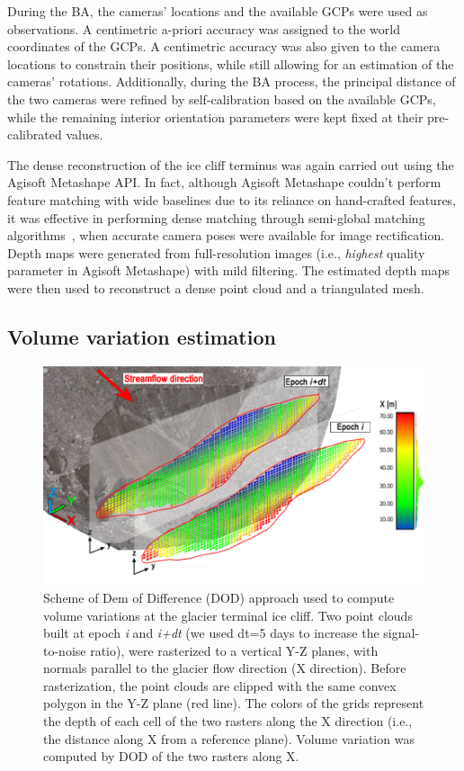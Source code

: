 During the BA, the cameras' locations and the available GCPs were used as observations.
A centimetric a-priori accuracy was assigned to the world coordinates of the GCPs.
A centimetric accuracy was also given to the camera locations to constrain their
positions, while still allowing for an estimation of the cameras' rotations.
Additionally, during the BA process, the principal distance of the
two cameras were refined by self-calibration based on the available GCPs, while the
remaining interior orientation parameters were kept fixed at their pre-calibrated values.

The dense reconstruction of the ice cliff terminus was again carried out using the
Agisoft Metashape API.
In fact, although Agisoft Metashape couldn't perform feature matching with wide baselines
due to its reliance on hand-crafted features, it was effective in performing dense
matching through semi-global matching
algorithms~\citep{Hirschmuller2012}, when accurate camera poses were available for image
rectification.
Depth maps were generated from full-resolution images (i.e., \textit{highest} quality parameter in Agisoft Metashape) with mild filtering.
The estimated depth maps were then used to reconstruct a dense point cloud and a
triangulated mesh.


\subsection{Volume variation estimation}\label{sec:4:volumevariation}

\begin{figure}[ht]
\centering
  \includegraphics[width=1.0\linewidth]{3_dod_scheme.png}
  \caption{Scheme of Dem of Difference (DOD) approach used to compute volume variations
    at the glacier terminal ice cliff.
    Two point clouds built at epoch \textit{i} and \textit{i+dt} (we used dt=5 days to increase the signal-to-noise ratio), were rasterized to a vertical Y-Z planes, with normals parallel to the glacier flow direction (X direction).
    Before rasterization, the point clouds are clipped with the same convex polygon in
    the Y-Z plane (red line).
    The colors of the grids represent the depth of each cell of the two rasters along the X direction (i.e., the distance along X from a reference plane).
    Volume variation was computed by DOD of the two rasters along X.}
  \label{fig:4:dod_scheme}
\end{figure}

